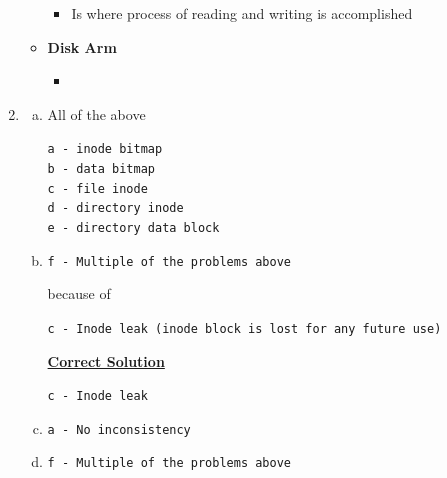 \documentclass[12pt]{article}
\begin{document}
\begin{enumerate}[1.]
\begin{itemize}
        \begin{itemize}
            \item Is where process of reading and writing is accomplished
        \end{itemize}

        \item \textbf{Disk Arm}

        \begin{itemize}
            \item
        \end{itemize}
    \end{itemize}

    \item

    \begin{enumerate}[a)]
        \item

        All of the above

        \texttt{a - inode bitmap}\\
        \texttt{b - data bitmap}\\
        \texttt{c - file inode}\\
        \texttt{d - directory inode}\\
        \texttt{e - directory data block}

        \item
        \texttt{f - Multiple of the problems above}

        \bigskip

        because of

        \bigskip

        \texttt{c - Inode leak (inode block is lost for any future use)}

        \begin{mdframed}
        \underline{\textbf{Correct Solution}}

        \bigskip

        \color{red}\texttt{c - Inode leak}\color{black}

        \end{mdframed}

        \item

        \texttt{a - No inconsistency}

        \item

        \texttt{f - Multiple of the problems above}

        \bigskip


\end{enumerate}
\end{enumerate}
\end{document}
